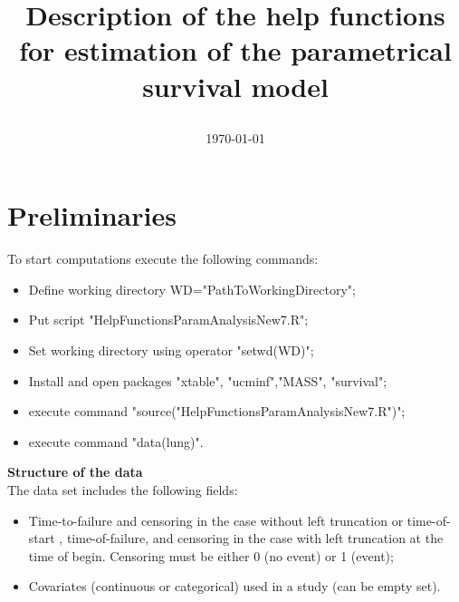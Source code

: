 \documentclass[A4document,12pt]{article}\usepackage[]{graphicx}\usepackage[]{color}
\begin{document}
\title{\begin{center}\textbf{Description of the help functions for estimation of the parametrical survival model} \end{center}}
\date{\today}
\maketitle
\small
{}
\newpage
\section{Preliminaries}
To start computations execute the following commands:
\begin{itemize}
\item Define working directory WD="PathToWorkingDirectory";
\item Put script "HelpFunctionsParamAnalysisNew7.R";
\item Set working directory using operator "setwd(WD)";
\item Install and open packages "xtable", "ucminf","MASS", "survival";
\item execute command "source("HelpFunctionsParamAnalysisNew7.R")";
\item execute command "data(lung)".
\end{itemize}
\noindent
{\textbf{Structure of the data}}
\\
\noindent
The data set includes the following fields:
\begin{itemize}
\item   Time-to-failure and censoring in the case without left truncation or time-of-start , time-of-failure, and censoring in the case with left truncation at the time of begin. Censoring must be either 0 (no event) or 1 (event);\
\item   Covariates (continuous or categorical) used in a study (can be empty set).
\end{itemize}

\clearpage
\end{document}
